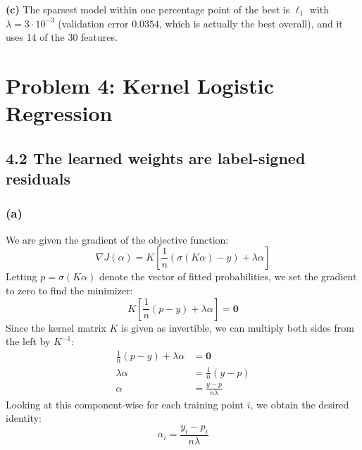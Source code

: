 \documentclass{article}
\begin{document}
\medskip
\noindent
\textbf{(c)} The sparsest model within one percentage point of the best is $\ell_1$ with
$\lambda = 3\cdot10^{-3}$ (validation error $0.0354$, which is actually the best overall),
and it uses 14 of the 30 features.

\section*{Problem 4: Kernel Logistic Regression}

\subsection*{4.2 The learned weights are label-signed residuals}

\subsubsection*{(a)}
We are given the gradient of the objective function:
\begin{equation*}
\nabla J(\alpha) = K \left[ \frac{1}{n}(\sigma(K\alpha) - y) + \lambda \alpha \right]
\end{equation*}
Letting $p = \sigma(K\alpha)$ denote the vector of fitted probabilities, we set the gradient to zero to find the minimizer:
\begin{equation*}
K \left[ \frac{1}{n}(p - y) + \lambda \alpha \right] = \mathbf{0}
\end{equation*}
Since the kernel matrix $K$ is given as invertible, we can multiply both sides from the left by $K^{-1}$:
\begin{align*}
\frac{1}{n}(p - y) + \lambda \alpha &= \mathbf{0} \\
\lambda \alpha &= \frac{1}{n}(y - p) \\
\alpha &= \frac{y - p}{n\lambda}
\end{align*}
Looking at this component-wise for each training point $i$, we obtain the desired identity:
\begin{equation*}
\alpha_i = \frac{y_i - p_i}{n\lambda}
\end{equation*}
\end{document}
